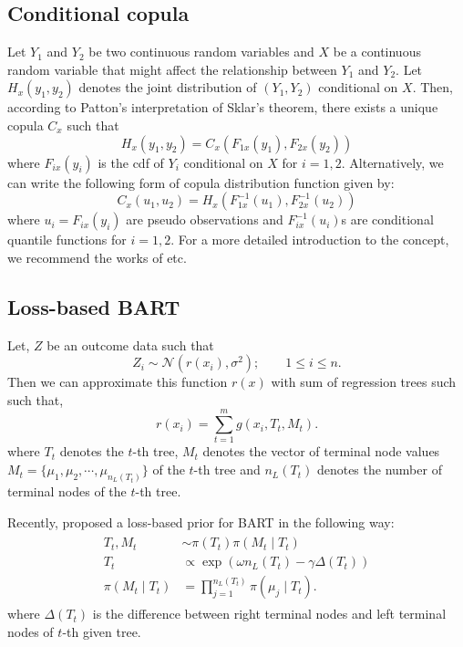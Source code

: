 \documentclass{amsart}
\begin{document}
\subsection{Conditional copula}
Let $Y_1$ and $Y_2$ be two continuous random variables and $X$ be a continuous random variable that might affect the relationship between $Y_1$ and $Y_2$. Let $H_x(y_1,y_2)$ denotes the joint distribution of $(Y_1,Y_2)$ conditional on $X$. Then, according to Patton's\cite{patton2006} interpretation of Sklar's\cite{sklar:1959} theorem, there exists a unique copula $C_x$ such that
\begin{equation*}
	H_x(y_1,y_2) = C_x(F_{1x}(y_1),F_{2x}(y_2))
\end{equation*}
where $F_{ix}(y_i)$ is the cdf of $Y_i$ conditional on $X$ for $i=1,2$. Alternatively, we can write the following form of copula distribution function given by:
\begin{equation*}
	C_x(u_1,u_2) = H_x\left(F_{1x}^{-1}(u_1),F_{2x}^{-1}(u_2)\right)
\end{equation*}
where $u_i = F_{ix}(y_i)$ are pseudo observations and $F_{ix}^{-1}(u_i)$s are conditional quantile functions
for $i=1,2$. For a more detailed introduction to the concept, we recommend the works of \citet{patton2006,acar2010,GIJBELS20111919} etc.

\subsection{Loss-based BART}

Let, $Z$ be an outcome data such that 
\begin{equation*}
	Z_i \sim \mathcal{N}\left(r(x_i),\sigma^2\right);\qquad 1\le i\le n.
\end{equation*}
Then we can approximate this function $r(x)$ with sum of regression trees such such that,
\begin{equation*}
	r(x_i) = \sum_{t=1}^m g(x_i, T_t, M_t).
\end{equation*}
where $T_t$ denotes the $t$-th tree, $M_t$ denotes the vector of terminal node values $M_t = \{\mu_1,\mu_2, \cdots, \mu_{n_L(T_t)}\}$ of the $t$-th tree and $n_L(T_t)$ denotes the number of terminal nodes of the $t$-th tree. 

Recently, \citet{serafini2024lossbasedpriortreetopologies} proposed a loss-based prior for BART in the following way:
\begin{align}
	\begin{split}
		T_t, M_t &\sim \pi(T_t)\pi(M_t\mid T_t)\\
		T_t &\propto \exp\left(\omega n_L(T_t)-\gamma\Delta(T_t)\right)\\
		\pi(M_t\mid T_t) & = \prod_{j=1}^{n_L(T_t)}\pi(\mu_j\mid T_t).
	\end{split}
\end{align}
where $\Delta(T_t)$ is the difference between right terminal nodes and left terminal nodes of $t$-th given tree.
\end{document}
